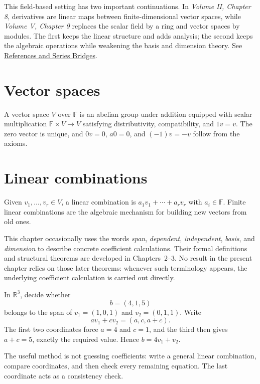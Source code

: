 \begin{remark}
This field-based setting has two important continuations. In
\emph{Volume II, Chapter 8}, derivatives are linear maps between
finite-dimensional vector spaces, while \emph{Volume V, Chapter 9} replaces
the scalar field by a ring and vector spaces by modules. The first keeps the
linear structure and adds analysis; the second keeps the algebraic operations
while weakening the basis and dimension theory. See
\hyperref[sec:i-references-and-series-bridges]{References and Series Bridges}.
\end{remark}

\section{Vector spaces}
A vector space $V$ over $\mathbb F$ is an abelian group under addition equipped with scalar multiplication $\mathbb F\times V\to V$ satisfying distributivity, compatibility, and $1v=v$. The zero vector is unique, and $0v=0$, $a0=0$, and $(-1)v=-v$ follow from the axioms.

\section{Linear combinations}
Given $v_1,\ldots,v_r\in V$, a linear combination is $a_1v_1+\cdots+a_rv_r$ with $a_i\in\mathbb F$. Finite linear combinations are the algebraic mechanism for building new vectors from old ones.

\begin{remark}
This chapter occasionally uses the words \emph{span}, \emph{dependent},
\emph{independent}, \emph{basis}, and \emph{dimension} to describe concrete
coefficient calculations. Their formal definitions and structural theorems are
developed in Chapters~2--3. No result in the present chapter relies on those
later theorems: whenever such terminology appears, the underlying coefficient
calculation is carried out directly.
\end{remark}


\begin{example}\label{ex:i01-expand-01}
In \(\mathbb R^3\), decide whether
\[
b=(4,1,5)
\]
belongs to the span of \(v_1=(1,0,1)\) and \(v_2=(0,1,1)\).
Write
\[
a v_1+c v_2=(a,c,a+c).
\]
The first two coordinates force \(a=4\) and \(c=1\), and the third then gives
\(a+c=5\), exactly the required value. Hence \(b=4v_1+v_2\).

The useful method is not guessing coefficients: write a general linear
combination, compare coordinates, and then check every remaining equation. The
last coordinate acts as a consistency check.
\end{example}
